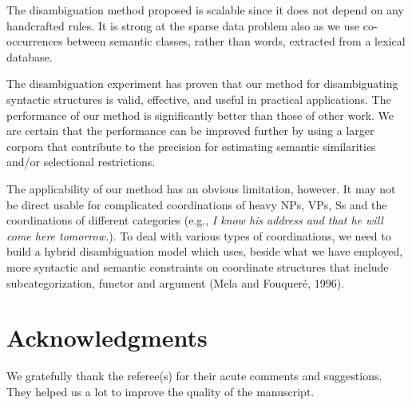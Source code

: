    The disambiguation method proposed is scalable since it does not depend on any
handcrafted rules. It is strong at the sparse data 
problem also as
we use co-occurrences between semantic classes, rather than words,
extracted from a lexical database. 

   The disambiguation experiment has proven that our method for
disambiguating syntactic structures  is valid, effective, and useful
in practical applications. The performance of our method is significantly
better than those of other work.
We are certain that the performance can be improved further by
using a larger corpora that contribute to the precision for  estimating  semantic 
similarities and/or selectional restrictions. 

   The applicability of our method has an obvious limitation, however. It may not
be direct usable for
complicated coordinations of heavy NPs, VPs, Ss and the coordinations of different
categories (e.g., {\it I know his address and that he will come here tomorrow.}). 
To deal with various types of coordinations, we need to build a hybrid
disambiguation model which uses, beside what we have employed, more syntactic and
semantic constraints on coordinate structures that include
subcategorization, functor and argument (Mela and Fouquer\'e, 1996).    


\section*{Acknowledgments}

We gratefully thank the referee(s) for their acute comments and suggestions. They helped
us a lot to improve the quality of the manuscript.

